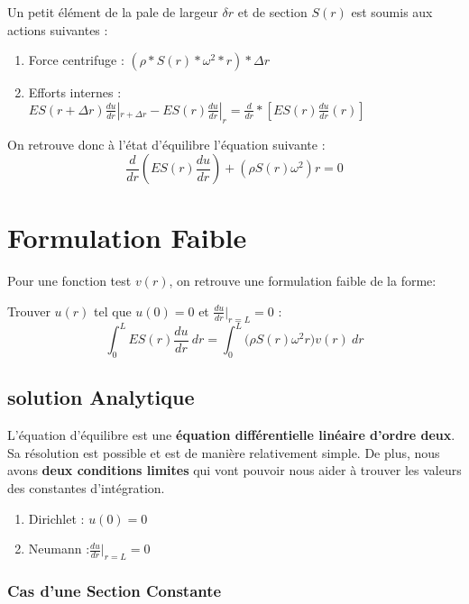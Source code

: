 \documentclass[a4paper,10pt]{report} %
\begin{document}
Un petit élément de la pale de largeur $\delta r$ et de section $S(r)$ est soumis aux actions suivantes :
\begin{enumerate}
	\item Force centrifuge : $(\rho*S(r)*\omega^2*r)*\Delta r$
	\item Efforts internes : $ES(r+\Delta r)\frac{du}{dr}|_{r+\Delta r}-ES(r)\frac{du}{dr}|_{r}=\frac{d}{dr}*[ES(r)\frac{du}{dr}(r)]$
\end{enumerate}


On retrouve donc à l'état d'équilibre l'équation suivante :
\begin{equation}
	\frac{d}{dr}(ES(r)\frac{du}{dr})+(\rho S(r)\omega^2)r =0
	\label{eqequilibre}
\end{equation}

\section{Formulation Faible}

Pour une fonction test $v(r)$, on retrouve une formulation faible de la forme:
\begin{center}
Trouver $u(r)$ tel que $u(0)=0$ et $\frac{du}{dr}\Big|_{r=L}=0$ :
	\begin{equation}
		\int_0^L \!ES(r)\frac{du}{dr}~dr=\int_0^L \! \big(\rho S(r)\omega^2r\big)v(r)~dr
		\label{formulationfaible}
	\end{equation}
\end{center}


\subsection{solution Analytique}

L'équation d'équilibre est une \textbf{équation différentielle linéaire d'ordre deux}. Sa résolution est possible et est de manière relativement simple. De plus, nous avons \textbf{deux conditions limites} qui vont pouvoir nous aider à trouver les valeurs des constantes d'intégration.
\begin{enumerate}
	\item Dirichlet : $u(0)=0$
	\item Neumann :$\frac{du}{dr}\Big|_{r=L}=0$
\end{enumerate}

\subsubsection{Cas d'une Section Constante}
\end{document}
